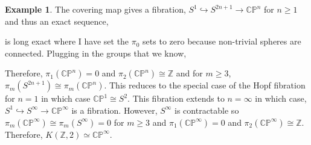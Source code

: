 \documentclass[12pt]{extarticle}
\newcommand{\Z}{\mathbb{Z}}
\theoremstyle{definition}
\newtheorem{example}[theorem]{Example}
\begin{document}
\newcommand{\cp}{\mathbb{CP}}

\begin{example}
The covering map gives a fibration, $S^1 \hookrightarrow S^{2n + 1} \rightarrow \cp^n$ for $n \ge 1$ and thus an exact sequence,
\begin{center}
\end{center}
is long exact where I have set the $\pi_0$ sets to zero because non-trivial spheres are connected. Plugging in the groups that we know,
\begin{center}
\end{center}
Therefore, $\pi_1(\cp^n) = 0$ and $\pi_2(\cp^n) \cong \Z$ and for $m \ge 3$, $\pi_m(S^{2n + 1}) \cong \pi_m(\cp^n)$. This reduces to the special case of the Hopf fibration for $n = 1$ in which case $\cp^1 \cong S^2$. 
This fibration extends to $n = \infty$ in which case, $S^1 \hookrightarrow S^\infty \to \cp^\infty$ is a fibration. However, $S^\infty$ is contractable so $\pi_m(\cp^\infty) \cong \pi_m(S^\infty) = 0$ for $m \ge 3$ and $\pi_1(\cp^\infty) = 0$ and $\pi_2(\cp^\infty) \cong \Z$. Therefore, $K(\Z, 2) \simeq \cp^\infty$. 
\end{example}
\end{document}

